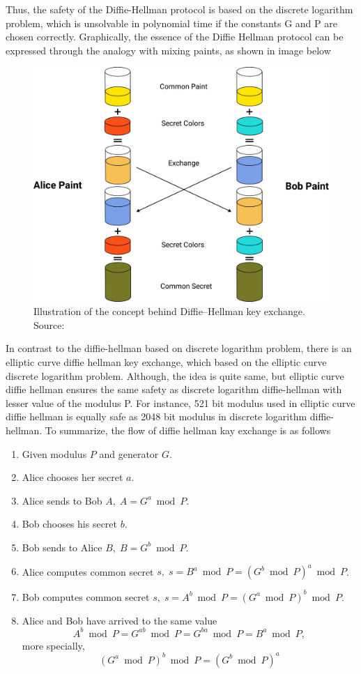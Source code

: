 Thus, the safety of the Diffie-Hellman protocol is based on the discrete logarithm problem, which is unsolvable
in polynomial time if the constants G and P are chosen correctly.
Graphically, the essence of the Diffie Hellman protocol can be expressed through the analogy with mixing paints, as shown in
image below
\begin{figure}[H]
    \centering
    \includegraphics[width=1\textwidth]{Pictures/Diffie-Hellman}
    \caption{Illustration of the concept behind Diffie–Hellman key exchange. Source: }\label{fig:figure4}
\end{figure}
In contrast to the diffie-hellman based on discrete logarithm problem, there is an elliptic curve diffie hellman
key exchange, which based on the elliptic curve discrete logarithm problem.
Although, the idea is quite same, but elliptic curve diffie hellman ensures the same safety as discrete logarithm
diffie-hellman with lesser value of the modulus P.
For instance, 521 bit modulus used in elliptic curve diffie hellman is equally safe as 2048 bit modulus in
discrete logarithm diffie-hellman.
To summarize, the flow of diffie hellman kay exchange is as follows
\begin{enumerate}
    \item Given modulus $P$ and generator $G$.
    \item Alice chooses her secret $a$.
    \item Alice sends to Bob $A, \; A = G^a \bmod P$.
    \item Bob chooses his secret $b$.
    \item Bob sends to Alice $B, \; B = G^b \bmod P$.
    \item Alice computes common secret $s, \; s = B^a \bmod P = (G^b \bmod P)^a \bmod P$.
    \item Bob computes common secret $s, \; s = A^b \bmod P = (G^a \bmod P)^b \bmod P$.
    \item Alice and Bob have arrived to the same value
    \[
        A^b \bmod P = G^{ab} \bmod P = G^{ba} \bmod P = B^a \bmod P,
    \]
    more specially,
    \[
        (G^a \bmod P)^b \bmod P = (G^b \bmod P)^a
    \]
\end{enumerate}


